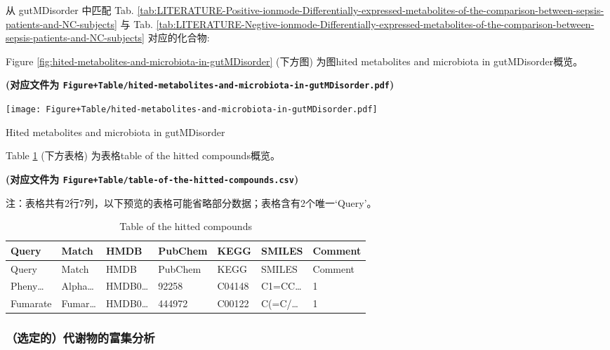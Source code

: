\documentclass[
]{article}
\begin{document}
从 gutMDisorder 中匹配 Tab. \ref{tab:LITERATURE-Positive-ionmode-Differentially-expressed-metabolites-of-the-comparison-between-sepsis-patients-and-NC-subjects} 与 Tab. \ref{tab:LITERATURE-Negtive-ionmode-Differentially-expressed-metabolites-of-the-comparison-between-sepsis-patients-and-NC-subjects} 对应的化合物:

Figure \ref{fig:hited-metabolites-and-microbiota-in-gutMDisorder} (下方图) 为图hited metabolites and microbiota in gutMDisorder概览。

\textbf{(对应文件为 \texttt{Figure+Table/hited-metabolites-and-microbiota-in-gutMDisorder.pdf})}

\def\@captype{figure}
\begin{center}
\texttt{[image: Figure+Table/hited-metabolites-and-microbiota-in-gutMDisorder.pdf]}
\caption{Hited metabolites and microbiota in gutMDisorder}\label{fig:hited-metabolites-and-microbiota-in-gutMDisorder}
\end{center}

Table \ref{tab:table-of-the-hitted-compounds} (下方表格) 为表格table of the hitted compounds概览。

\textbf{(对应文件为 \texttt{Figure+Table/table-of-the-hitted-compounds.csv})}

\begin{center}\begin{tcolorbox}[colback=gray!10, colframe=gray!50, width=0.9\linewidth, arc=1mm, boxrule=0.5pt]注：表格共有2行7列，以下预览的表格可能省略部分数据；表格含有2个唯一`Query'。
\end{tcolorbox}
\end{center}

\begin{longtable}[]{@{}lllllll@{}}
\caption{\label{tab:table-of-the-hitted-compounds}Table of the hitted compounds}\tabularnewline
\toprule
Query & Match & HMDB & PubChem & KEGG & SMILES & Comment\tabularnewline
\midrule
\endfirsthead
\toprule
Query & Match & HMDB & PubChem & KEGG & SMILES & Comment\tabularnewline
\midrule
\endhead
Pheny\ldots{} & Alpha\ldots{} & HMDB0\ldots{} & 92258 & C04148 & C1=CC\ldots{} & 1\tabularnewline
Fumarate & Fumar\ldots{} & HMDB0\ldots{} & 444972 & C00122 & C(=C/\ldots{} & 1\tabularnewline
\bottomrule
\end{longtable}

\hypertarget{ux9009ux5b9aux7684ux4ee3ux8c22ux7269ux7684ux5bccux96c6ux5206ux6790}{%
\subsubsection{（选定的）代谢物的富集分析}\label{ux9009ux5b9aux7684ux4ee3ux8c22ux7269ux7684ux5bccux96c6ux5206ux6790}}
\end{document}
